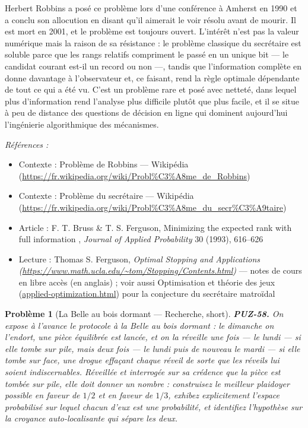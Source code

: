 \documentclass[11pt]{article}
\newtheorem{problem}{Problème}
\newenvironment{refs}{\par\small\noindent\emph{Références :}\begin{itemize}\setlength\itemsep{0pt}}{\end{itemize}\normalsize}
\begin{document}
\noindent Herbert Robbins a posé ce problème lors d'une conférence à Amherst en 1990
et a conclu son allocution en disant qu'il aimerait le voir résolu avant de mourir. Il est
mort en 2001, et le problème est toujours ouvert. L'intérêt n'est pas la valeur numérique mais
la raison de sa résistance : le problème classique du secrétaire est soluble parce que les
rangs relatifs compriment le passé en un unique bit --- le candidat courant est-il un record ou
non ---, tandis que l'information complète en donne davantage à l'observateur et, ce faisant,
rend la règle optimale dépendante de tout ce qui a été vu. C'est un problème rare et posé avec
netteté, dans lequel plus d'information rend l'analyse plus difficile plutôt que plus facile,
et il se situe à peu de distance des questions de décision en ligne qui dominent aujourd'hui
l'ingénierie algorithmique des mécanismes.

\begin{refs}
\item Contexte : Problème de Robbins --- Wikipédia (\url{https://fr.wikipedia.org/wiki/Probl%C3%A8me_de_Robbins})
\item Contexte : Problème du secrétaire --- Wikipédia (\url{https://fr.wikipedia.org/wiki/Probl%C3%A8me_du_secr%C3%A9taire})
\item Article : F. T. Bruss \& T. S. Ferguson, \og{} Minimizing the expected rank with full information \fg{}, \textit{Journal of Applied Probability} 30 (1993), 616--626
\item Lecture : Thomas S. Ferguson, \textit{Optimal Stopping and Applications (\url{https://www.math.ucla.edu/~tom/Stopping/Contents.html})} --- notes de cours en libre accès (en anglais) ; voir aussi Optimisation et théorie des jeux (\url{applied-optimization.html}) pour la conjecture du secrétaire matroïdal
\end{refs}

\bigskip

\begin{problem}[{La Belle au bois dormant --- Recherche, short}]
\textbf{PUZ-58.} On expose à l'avance le protocole à la Belle au bois
dormant : le dimanche on l'endort, une pièce équilibrée est lancée, et on la réveille une
fois --- le lundi --- si elle tombe sur pile, mais deux fois --- le lundi puis de nouveau le mardi ---
si elle tombe sur face, une drogue effaçant chaque réveil de sorte que les réveils lui soient
indiscernables. Réveillée et interrogée sur sa crédence que la pièce est tombée sur pile, elle
doit donner un nombre : construisez le meilleur plaidoyer possible en faveur de $ 1/2 $ et en
faveur de $ 1/3 $, exhibez explicitement l'espace probabilisé sur lequel chacun d'eux est
une probabilité, et identifiez l'hypothèse sur la croyance auto-localisante qui sépare les
deux.
\end{problem}
\end{document}
